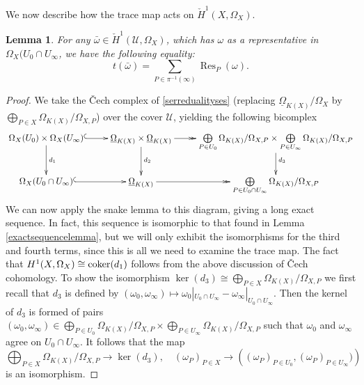 \documentclass[draft, 11pt]{article} %
\theoremstyle{plain}
\newtheorem{lem}[defn]{Lemma}
\theoremstyle{remark}
\newcommand{\ra}{\rightarrow}
\newcommand{\cU}{{\mathcal U}}
\newcommand{\cech}{\v{C}ech }
\DeclareMathOperator{\res}{Res}
\begin{document}
We now describe how the trace map acts on $\check{H}^1(X,\Omega_X)$.
\begin{lem}\label{tracemaplemma}
For any $\bar \omega \in \check{H}^1\left (\cU, \Omega_X\right )$, which has $\omega$ as a representative in $\Omega_X(U_0 \cap U_\infty$, we have the following equality:
\[
t(\bar \omega) = \sum_{P \in \pi^{-1}(\infty)}\res_P(\omega).
\]
\end{lem}
\begin{proof}
We take the \cech complex of \eqref{serredualityses} (replacing $\underline{\Omega}_{K(X)}/\Omega_X$ by $\bigoplus_{P \in X}\Omega_{K(X)}/\Omega_{X,P}$) over the cover $\cU$, yielding the following bicomplex
\begin{equation}\label{dualitydiagram2}
\xymatrix{\Omega_X(U_0)\times\Omega_X(U_\infty) \ar@{^{(}->}[r] \ar[d]^{d_1} & \underline{\Omega}_{K(X)} \times \underline{\Omega}_{K(X)} \ar[d]^{d_2} \ar@{->>}[r] & \bigoplus \limits_{P \in U_0} \Omega_{K(X)}/\Omega_{X,P} \times \bigoplus \limits_{P \in U_\infty} \Omega_{K(X)}/\Omega_{X,P} \ar[d]^{d_3} \\
\Omega_X(U_0 \cap U_\infty) \ar@{^{(}->}[r]  & \underline{\Omega}_{K(X)} \ar@{->>}[r] & \bigoplus \limits_{P\in U_0 \cap U_\infty} \Omega_{K(X)}/\Omega_{X,P} }
\end{equation}
We can now apply the snake lemma to this diagram, giving a long exact sequence.
In fact, this sequence is isomorphic to that found in Lemma \ref{exactsequencelemma}, but we will only exhibit the isomorphisms for the third and fourth terms, since this is all we need to examine the trace map.
The fact that $H^1(X,\Omega_X) \cong {\rm coker}(d_1)$ follows from the above discussion of \cech cohomology.
To show the isomorphism $\ker(d_3) \cong \bigoplus_{P \in X} \Omega_{K(X)}/\Omega_{X,P}$ we first recall that $d_3$ is defined by $(\omega_0, \omega_\infty) \mapsto \omega_0|_{U_0 \cap U_\infty} - \omega_\infty|_{U_0 \cap U_\infty}$.
Then the kernel of $d_3$ is formed of pairs $(\omega_0, \omega_\infty) \in \bigoplus_{P \in U_0} \Omega_{K(X)}/\Omega_{X,P} \times \bigoplus_{P \in  U_\infty} \Omega_{K(X)}/\Omega_{X,P}$ such that $\omega_0$ and $\omega_\infty$ agree on $U_0 \cap U_\infty$.
It follows that the map 
\[
\bigoplus_{P \in X} \Omega_{K(X)}/\Omega_{X,P}\ra\ker(d_3), \quad  (\omega_P)_{P \in X} \to \left( (\omega_P)_{ P \in U_0}, (\omega_P)_{P \in U_\infty}) \right)
\]
is an isomorphism.


\end{proof}
\end{document}
